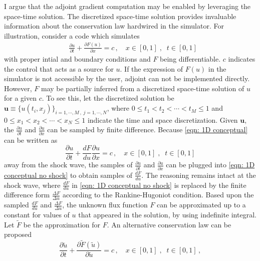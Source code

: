 I argue that the adjoint gradient computation may be enabled by leveraging the space-time solution.
The discretized space-time solution provides invaluable information about the conservation law
hardwired in the simulator. For illustration, consider a code which simulates
\begin{equation}\begin{split}
    &\frac{\partial u}{\partial t} + \frac{\partial F(u)}{\partial x} = c\,,\quad
    x \in [0,1] \;, \;\; t\in[0,1]
    \label{eqn: 1D conceptual}
\end{split}\end{equation}
with proper intial and boundary conditions and $F$ being differentiable. 
$c$ indicates the control that acts as a source for $u$.
If the expression of $F(u)$ in the simulator is not accessible by the user, 
adjoint can not be implemented directly. However, $F$ may be partially inferred from 
a discretized space-time solution of $u$ for a given $c$.
To see this, let the discretized solution be $\boldsymbol{u}\equiv \{u(t_i, x_j)\}_{i=1,\cdots,M\,,\; j=1,\cdots, N}$,
where $0\le t_1 < t_2 < \cdots < t_M \le 1$ and $0 \le x_1 < x_2 < \cdots < x_N \le 1$ indicate the time and space discretization. 
Given $\boldsymbol{u}$, the $\frac{\partial u}{\partial t}$ and $\frac{\partial u}{\partial x}$ can be sampled by finite difference.
Because \eqref{eqn: 1D conceptual} can be written as
\begin{equation}
    \frac{\partial u}{\partial t} + \frac{d F}{du} \frac{\partial u}{\partial x} = c\,,\quad
    x \in [0,1] \;, \;\; t\in[0,1]
    \label{eqn: 1D conceptual no shock}
\end{equation}
away from the shock wave, the samples of $\frac{\partial u}{\partial t}$ and $\frac{\partial u}{\partial x}$
can be plugged into \eqref{eqn: 1D conceptual no shock} to obtain samples of $\frac{dF}{du}$.
The reasoning remains intact at the shock wave, where $\frac{dF}{du}$ in \eqref{eqn: 1D conceptual no shock} is 
replaced by the finite difference form $\frac{\Delta F}{\Delta u}$ according to the Rankine-Hugoniot condition.
Based upon the sampled $\frac{dF}{du}$ and $\frac{\Delta F}{\Delta u}$, the unknown flux function $F$
can be approximated up to a constant 
for values of $u$ that appeared in the solution, 
by using indefinite integral. Let $\tilde{F}$ be the approximation for $F$.
An alternative conservation law can be proposed
\begin{equation}
    \frac{\partial \tilde{u}}{\partial t} + \frac{\partial \tilde{F}(\tilde{u})}{\partial \tilde{u}} = c\,,\quad
    x \in [0,1] \;, \;\; t\in[0,1]\,,
    \label{eqn: 1D conceptual inferred}
\end{equation}
